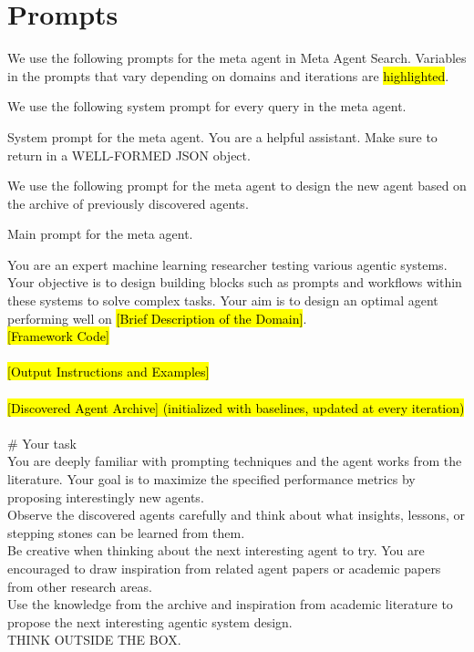 \documentclass{article} %
\newcommand{\ouralgo}{Meta Agent Search\xspace}
\begin{document}
\section{Prompts}
\label{append_section:prompt}

We use the following prompts for the meta agent in \ouralgo. Variables in the prompts that vary depending on domains and iterations are \hl{highlighted}.

We use the following system prompt for every query in the meta agent.
\begin{mybox}{System prompt for the meta agent.}
\small
You are a helpful assistant. Make sure to return in a WELL-FORMED JSON object.
\end{mybox}

We use the following prompt for the meta agent to design the new agent based on the archive of previously discovered agents.
\begin{mybox}{Main prompt for the meta agent.}
\small

You are an expert machine learning researcher testing various agentic systems. Your objective is to design building blocks such as prompts and workflows within these systems to solve complex tasks. Your aim is to design an optimal agent performing well on \hl{[Brief Description of the Domain]}.\\

\hl{[Framework Code]}\\ \\
\hl{[Output Instructions and Examples]}\\\\
\hl{[Discovered Agent Archive] (initialized with baselines, updated at every iteration)}\\\\

\# Your task \\
You are deeply familiar with prompting techniques and the agent works from the literature. Your goal is to maximize the specified performance metrics by proposing interestingly new agents. \\
Observe the discovered agents carefully and think about what insights, lessons, or stepping stones can be learned from them. \\
Be creative when thinking about the next interesting agent to try. You are encouraged to draw inspiration from related agent papers or academic papers from other research areas. \\
Use the knowledge from the archive and inspiration from academic literature to propose the next interesting agentic system design. \\
THINK OUTSIDE THE BOX.
\end{mybox}
\end{document}
